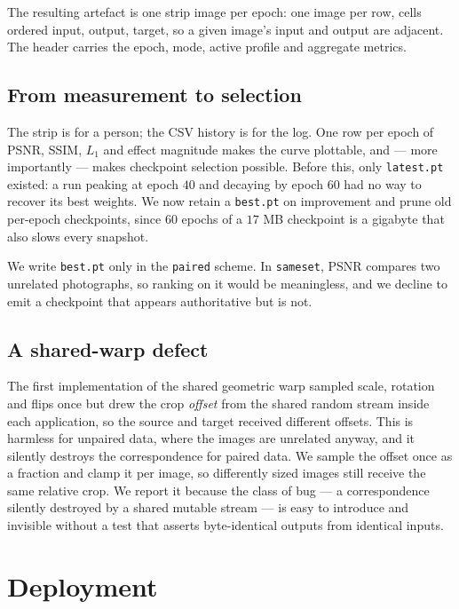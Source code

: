 \documentclass[11pt,a4paper]{article}
\newcommand{\code}[1]{\texttt{#1}}
\begin{document}
The resulting artefact is one strip image per epoch: one image per row, cells
ordered input, output, target, so a given image's input and output are adjacent.
The header carries the epoch, mode, active profile and aggregate metrics.

\subsection{From measurement to selection}

The strip is for a person; the CSV history is for the log. One row per epoch of
PSNR, SSIM, $L_1$ and effect magnitude makes the curve plottable, and --- more
importantly --- makes checkpoint selection possible. Before this, only
\code{latest.pt} existed: a run peaking at epoch $40$ and decaying by epoch $60$
had no way to recover its best weights. We now retain a \code{best.pt} on
improvement and prune old per-epoch checkpoints, since $60$ epochs of a
$17$ MB checkpoint is a gigabyte that also slows every snapshot.

We write \code{best.pt} only in the \code{paired} scheme. In \code{sameset},
PSNR compares two unrelated photographs, so ranking on it would be meaningless,
and we decline to emit a checkpoint that appears authoritative but is not.

\subsection{A shared-warp defect}

The first implementation of the shared geometric warp sampled scale, rotation and
flips once but drew the crop \emph{offset} from the shared random stream inside
each application, so the source and target received different offsets. This is
harmless for unpaired data, where the images are unrelated anyway, and it
silently destroys the correspondence for paired data. We sample the offset once
as a fraction and clamp it per image, so differently sized images still receive
the same relative crop. We report it because the class of bug --- a
correspondence silently destroyed by a shared mutable stream --- is easy to
introduce and invisible without a test that asserts byte-identical outputs from
identical inputs.

\section{Deployment}
\end{document}

